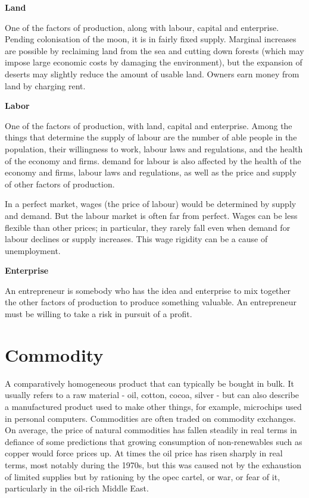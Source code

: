 \documentclass[11pt,]{book}
\theoremstyle{definition}
\theoremstyle{definition}
\theoremstyle{definition}
\theoremstyle{remark}
\begin{document}
\textbf{Land}

One of the factors of production, along with labour, capital and
enterprise. Pending colonisation of the moon, it is in fairly fixed
supply. Marginal increases are possible by reclaiming land from the sea
and cutting down forests (which may impose large economic costs by
damaging the environment), but the expansion of deserts may slightly
reduce the amount of usable land. Owners earn money from land by
charging rent.

\textbf{Labor}

One of the factors of production, with land, capital and enterprise.
Among the things that determine the supply of labour are the number of
able people in the population, their willingness to work, labour laws
and regulations, and the health of the economy and firms. demand for
labour is also affected by the health of the economy and firms, labour
laws and regulations, as well as the price and supply of other factors
of production.

In a perfect market, wages (the price of labour) would be determined by
supply and demand. But the labour market is often far from perfect.
Wages can be less flexible than other prices; in particular, they rarely
fall even when demand for labour declines or supply increases. This wage
rigidity can be a cause of unemployment.

\textbf{Enterprise}

An entrepreneur is somebody who has the idea and enterprise to mix
together the other factors of production to produce something valuable.
An entrepreneur must be willing to take a risk in pursuit of a profit.

\section{Commodity}\label{commodity}

A comparatively homogeneous product that can typically be bought in
bulk. It usually refers to a raw material - oil, cotton, cocoa, silver -
but can also describe a manufactured product used to make other things,
for example, microchips used in personal computers. Commodities are
often traded on commodity exchanges. On average, the price of natural
commodities has fallen steadily in real terms in defiance of some
predictions that growing consumption of non-renewables such as copper
would force prices up. At times the oil price has risen sharply in real
terms, most notably during the 1970s, but this was caused not by the
exhaustion of limited supplies but by rationing by the opec cartel, or
war, or fear of it, particularly in the oil-rich Middle East.
\end{document}
